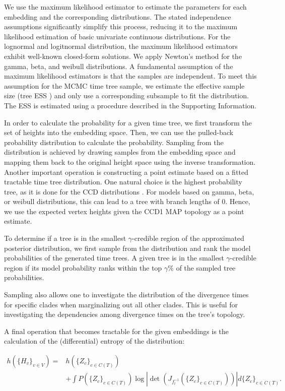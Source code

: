 \documentclass[10pt,letterpaper]{article}
\begin{document}
We use the maximum likelihood estimator to estimate the parameters for each embedding and the corresponding distributions. The stated independence assumptions significantly simplify this process, reducing it to the maximum likelihood estimation of basic univariate continuous distributions. For the lognormal and logitnormal distribution, the maximum likelihood estimators exhibit well-known closed-form solutions. We apply Newton's method for the gamma, beta, and weibull distributions. A fundamental assumption of the maximum likelihood estimators is that the samples are independent. To meet this assumption for the MCMC time tree sample, we estimate the effective sample size (tree ESS \cite{treeess}) and only use a corresponding subsample to fit the distribution. The ESS is estimated using a procedure described in the Supporting Information.

In order to calculate the probability for a given time tree, we first transform the set of heights into the embedding space. Then, we can use the pulled-back probability distribution to calculate the probability. Sampling from the distribution is achieved by drawing samples from the embedding space and mapping them back to the original height space using the inverse transformation. Another important operation is constructing a point estimate based on a fitted tractable time tree distribution. One natural choice is the highest probability tree, as it is done for the CCD distributions \cite{ccd}. For models based on gamma, beta, or weibull distributions, this can lead to a tree with branch lengths of $0$. Hence, we use the expected vertex heights given the CCD1 MAP topology as a point estimate.

To determine if a tree is in the smallest $\gamma$-credible region of the approximated posterior distribution, we first sample from the distribution and rank the model probabilities of the generated time trees. A given tree is in the smallest $\gamma$-credible region if its model probability ranks within the top $\gamma$\% of the sampled tree probabilities.

Sampling also allows one to investigate the distribution of the divergence times for specific clades when marginalizing out all other clades. This is useful for investigating the dependencies among divergence times on the tree's topology.

A final operation that becomes tractable for the given embeddings is the calculation of the (differential) entropy of the distribution:

\begin{equation*}
	\begin{split}
		h(\{H_v\}_{v \in V}) = &h(\{Z_c\}_{c \in C(T)}) \\
		& + \int P(\{Z_c\}_{c \in C(T)}) \log \left| \det{\left(J_{f_t^{-1}}(\{Z_c\}_{c \in C(T)})\right)} \right| d \{Z_c\}_{c \in C(T)}.
	\end{split}
\end{equation*}
\end{document}
